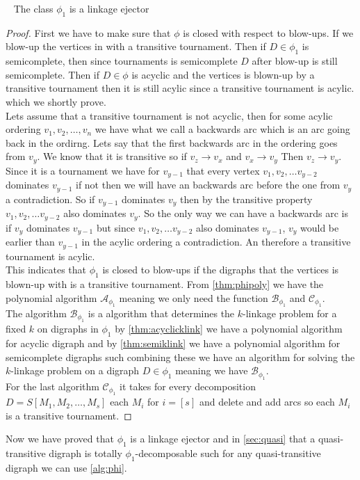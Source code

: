 \begin{lemma}~\cite{bangJGT85}
    The class $\phi_1$ is a linkage ejector
    \label{thm:phi1ejector}
\end{lemma}
\begin{proof}
    First we have to make sure that $\phi$ is closed with respect to blow-ups. 
    If we blow-up the vertices in with a transitive tournament.
    Then if $D\in \phi_1$ is semicomplete, then since tournaments is semicomplete $D$ after blow-up is still semicomplete.
    Then if $D\in \phi$ is acyclic and the vertices is blown-up by a transitive tournament then it is still acylic since a transitive tournament is acylic. which we shortly prove.\\
    Lets assume that a transitive tournament is not acyclic, then for some acylic ordering $v_1,v_2,\dots , v_n$ we have what we call a backwards arc which is an arc going back in the ordirng. 
    Lets say that the first backwards arc in the ordering goes from $v_y$. 
    We know that it is transitive so if $v_z \rightarrow v_x$ and $v_x \rightarrow v_y$ Then $v_z\rightarrow v_y$. 
    Since it is a tournament we have for $v_{y-1}$ that every vertex $v_1,v_2,\dots v_{y-2}$ dominates $v_{y-1}$ if not then we will have an backwards arc before the one from $v_y$ a contradiction.
    So if $v_{y-1}$ dominates $v_y$ then by the transitive property $v_1,v_2,\dots v_{y-2}$ also dominates $v_y$.
    So the only way we can have a backwards arc is if $v_y$ dominates $v_{y-1}$ but since $v_1,v_2,\dots v_{y-2}$ also dominates $v_{y-1}$, $v_y$ would be earlier than $v_{y-1}$ in the acylic ordering a contradiction. An therefore a transitive tournament is acylic.\\
    This indicates that $\phi_1$ is closed to blow-ups if the digraphs that the vertices is blown-up with is a transitive tournament.
    From \autoref{thm:phipoly} we have the polynomial algorithm $\mathcal{A}_{\phi_1}$ meaning we only need the function $\mathcal{B}_{\phi_1}$ and $\mathcal{C}_{\phi_1}$.\\
    The algorithm $\mathcal{B}_{\phi_1}$ is a algorithm that determines the $k$-linkage problem for a fixed $k$ on digraphs in $\phi_1$ by \autoref{thm:acyclicklink} we have a polynomial algorithm for acyclic digraph and by \autoref{thm:semiklink} we have a polynomial algorithm for semicomplete digraphs such combining these we have an algorithm for solving the $k$-linkage problem on a digraph $D\in \phi_1$ meaning we have $\mathcal{B}_{\phi_1}$. \\
    For the last algorithm $\mathcal{C}_{\phi_1}$ it takes for every decomposition $D=S[M_1,M_2,\dots , M_s]$ each $M_i$ for $i=[s]$ and delete and add arcs so each $M_i$ is a transitive tournament.
\end{proof}

Now we have proved that $\phi_1$ is a linkage ejector and in \autoref{sec:quasi} that a quasi-transitive digraph is totally $\phi_1$-decomposable such for any quasi-transitive digraph we can use \autoref{alg:phi}.  